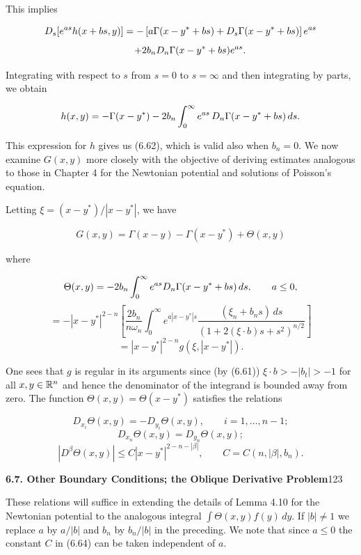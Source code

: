 This implies

\[
D_s\!\left[e^{as} h(x + bs, y)\right]
= -\left[a\Gamma(x - y^* + bs) + D_s\Gamma(x - y^* + bs)\right] e^{as}
\]
\[
\qquad + 2b_n D_n\Gamma(x - y^* + bs) e^{as}.
\]

Integrating with respect to $s$ from $s = 0$ to $s = \infty$ and then integrating by parts, we
obtain

\[
h(x, y) = -\Gamma(x - y^*) - 2b_n \int_0^\infty e^{as}\,D_n\Gamma(x - y^* + bs)\,ds.
\]

This expression for $h$ gives us (6.62), which is valid also when $b_n = 0$.
We now examine $G(x, y)$ more closely with the objective of deriving estimates
analogous to those in Chapter 4 for the Newtonian potential and solutions of
Poisson's equation.

Letting $\xi = (x - y^*)/|x - y^*|$, we have

\[
G(x, y) = \Gamma(x - y) - \Gamma(x - y^*) + \Theta(x, y)
\]

where

\[
\Theta(x, y) = -2b_n \int_0^\infty e^{as}D_n\Gamma(x - y^* + bs)\,ds,\qquad a \le 0,
\]
\[
= -|x - y^*|^{2-n}\!\left[\frac{2b_n}{n\omega_n}\int_0^\infty e^{a|x-y^*|s}
\frac{(\xi_n + b_n s)\,ds}{\left(1 + 2(\xi\cdot b)s + s^2\right)^{n/2}}\right]
\]
\[
= |x - y^*|^{2-n} g(\xi, |x - y^*|).
\]

One sees that $g$ is regular in its arguments since (by (6.61)) $\xi\cdot b > -|b_t| > -1$
for all $x, y \in \mathbb{R}^n$ and hence the denominator of the integrand is bounded away from
zero. The function $\Theta(x, y) = \Theta(x - y^*)$ satisfies the relations

\begin{equation}
\label{eq:6.64}
D_{x_i}\Theta(x, y) = -D_{y_i}\Theta(x, y),\qquad i = 1, \ldots, n - 1 ;
\end{equation}
\[
D_{x_n}\Theta(x, y) = D_{y_n}\Theta(x, y);
\]
\[
|D^\beta \Theta(x, y)| \le C|x - y^*|^{2-n-|\beta|},\qquad C = C(n, |\beta|, b_n).
\]





\noindent\textbf{6.7. Other Boundary Conditions; the Oblique Derivative Problem}\hfill 123

\medskip

These relations will suffice in extending the details of Lemma 4.10 for the Newtonian
potential to the analogous integral $\int \Theta(x,y)f(y)\,dy$. If $|b|\neq 1$ we replace $a$ by
$a/|b|$ and $b_n$ by $b_n/|b|$ in the preceding. We note that since $a\leq 0$ the constant $C$ in
(6.64) can be taken independent of $a$.

